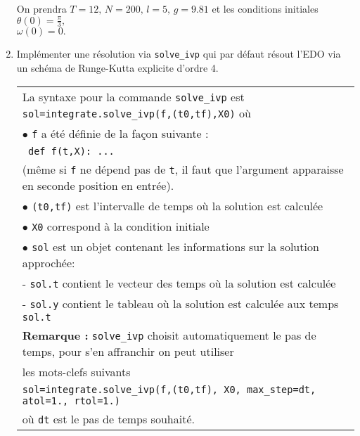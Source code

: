 \documentclass[12pt]{article}
\begin{document}
\begin{exo}
\begin{enumerate}
On prendra $T=12,\, N=200,\,l=5,\,g=9.81$
et les conditions initiales 
$\theta(0)=\frac{\pi}{3},\,$ \\ $\omega(0)=0.$
\item Implémenter une résolution via \texttt{solve\_ivp} qui par défaut résout l’EDO via un schéma de Runge-Kutta explicite d’ordre 4.
\\
\begin{tabular}{|l|}
 \hline
La syntaxe pour la commande \texttt{solve\_ivp}  est \texttt{sol=integrate.solve\_ivp(f,(t0,tf),X0)} où \\
$\bullet$ \texttt{f} a \'et\'e d\'efinie de la fa\c con suivante : \\
 \texttt{ def f(t,X): ... }\\
(m\^eme si  \texttt{f}  ne d\'epend pas de \texttt{t}, il faut que l'argument apparaisse en seconde position en entr\'ee).\\ 
$\bullet$ \texttt{(t0,tf)} est l’intervalle de temps où la solution est calculée \\
$\bullet$ \texttt{X0} correspond \`a la condition initiale \\
$\bullet$ \texttt{sol} est un objet contenant les informations sur la solution approchée: \\
\quad  - \texttt{sol.t} contient le vecteur des temps où la solution est calculée\\
\quad - \texttt{sol.y} contient le tableau où la solution est calculée aux temps \texttt{sol.t}\\
\textbf{Remarque :} \texttt{solve\_ivp} choisit automatiquement le pas de temps, pour s’en affranchir on peut utiliser\\ les mots-clefs suivants
\\ 
\texttt{sol=integrate.solve\_ivp(f,(t0,tf), X0, max\_step=dt, atol=1., rtol=1.)} \\ où \texttt{dt} est le pas de temps souhaité. 
 \\
 \hline
\end{tabular}
 \vspace{0.2cm}


\end{enumerate}
\end{exo}
\end{document}
